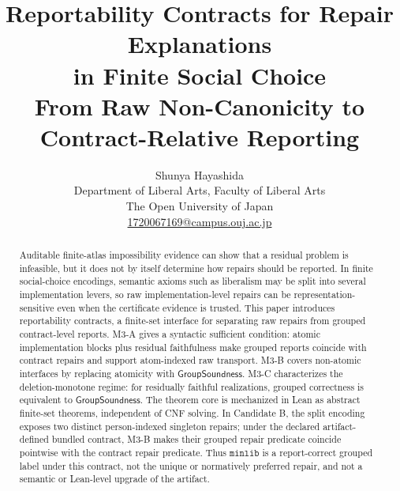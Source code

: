 \documentclass[11pt]{article}
\title{Reportability Contracts for Repair Explanations\\
in Finite Social Choice\\[0.4em]
\large From Raw Non-Canonicity to Contract-Relative Reporting}
\author{Shunya Hayashida\\
Department of Liberal Arts, Faculty of Liberal Arts\\
The Open University of Japan\\
\href{mailto:1720067169@campus.ouj.ac.jp}{1720067169@campus.ouj.ac.jp}}
\date{}
\newcommand{\GroupSoundness}{\mathsf{GroupSoundness}}
\theoremstyle{definition}
\theoremstyle{remark}
\begin{document}
\maketitle

\begin{abstract}
Auditable finite-atlas impossibility evidence can show that a residual problem
is infeasible, but it does not by itself determine how repairs should be
reported.  In finite social-choice encodings, semantic axioms such as
liberalism may be split into several implementation levers, so raw
implementation-level repairs can be representation-sensitive even when the
certificate evidence is trusted.  This paper introduces reportability
contracts, a finite-set interface for separating raw repairs from grouped
contract-level reports.  M3-A gives a syntactic sufficient condition: atomic
implementation blocks plus residual faithfulness make grouped reports coincide
with contract repairs and support atom-indexed raw transport.  M3-B covers
non-atomic interfaces by replacing atomicity with \(\GroupSoundness\).  M3-C
characterizes the deletion-monotone regime: for residually faithful
realizations, grouped correctness is equivalent to \(\GroupSoundness\).  The
theorem core is mechanized in Lean as abstract finite-set theorems, independent
of CNF solving.  In Candidate B, the split encoding exposes two distinct
person-indexed singleton repairs; under the declared artifact-defined bundled
contract, M3-B makes their grouped repair predicate coincide pointwise with the
contract repair predicate.  Thus \(\mathtt{minlib}\) is a report-correct
grouped label under this contract, not the unique or normatively preferred
repair, and not a semantic or Lean-level upgrade of the artifact.
\end{abstract}











\appendix






\end{document}
